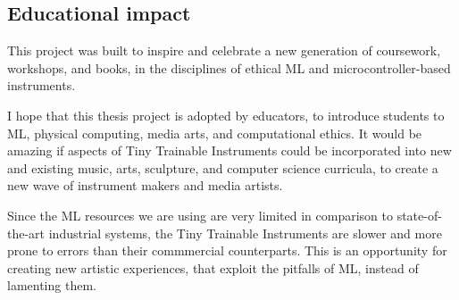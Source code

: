 \subsection{Educational impact}

This project was built to inspire and celebrate a new generation of coursework, workshops, and books, in the disciplines of ethical \acrshort{ML} and microcontroller-based instruments.

I hope that this thesis project is adopted by educators, to introduce students to \acrshort{ML}, physical computing, media arts, and computational ethics. It would be amazing if aspects of Tiny Trainable Instruments could be incorporated into new and existing music, arts, sculpture, and computer science curricula, to create a new wave of instrument makers and media artists.

Since the \acrshort{ML} resources we are using are very limited in comparison to state-of-the-art industrial systems, the Tiny Trainable Instruments are slower and more prone to errors than their commmercial counterparts. This is an opportunity for creating new artistic experiences, that exploit the pitfalls of \acrshort{ML}, instead of lamenting them.
